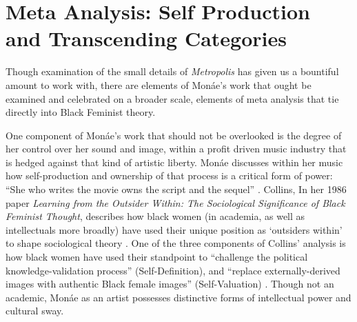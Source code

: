 \documentclass[a4paper, 11pt]{article} %
\begin{document}



\section*{Meta Analysis: Self Production and Transcending Categories}

Though examination of the small details of \emph{Metropolis} has given us a bountiful amount to work with, there are elements of Mon\'ae's work that ought be examined and celebrated on a broader scale, elements of meta analysis that tie directly into Black Feminist theory.

One component of Mon\'ae's work that should not be overlooked is the degree of her control over her sound and image, within a profit driven music industry that is hedged against that kind of artistic liberty.
Mon\'ae discusses within her music how self-production and ownership of that process is a critical form of power: 
``She who writes the movie owns the script and the sequel'' \cite{queen}.
Collins, In her 1986 paper \emph{Learning from the Outsider Within: The Sociological Significance of Black Feminist Thought}, describes how black women (in academia, as well as intellectuals more broadly) have used their unique position as `outsiders within' to shape sociological theory \cite{collins86}.
One of the three components of Collins' analysis is how black women have used their standpoint to ``challenge the political knowledge-validation process'' (Self-Definition), and ``replace externally-derived images with authentic Black female images'' (Self-Valuation) \cite{collins86}.
Though not an academic, Mon\'ae as an artist possesses distinctive forms of intellectual power and cultural sway.
\end{document}
